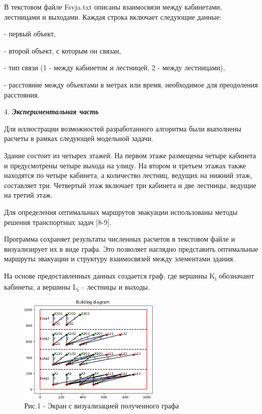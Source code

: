 \begin{multicols}{2}
В текстовом файле Fsvja.txt описаны взаимосвязи между кабинетами,
лестницами и выходами. Каждая строка включает следующие данные:

- первый объект,

- второй объект, с которым он связан,

- тип связи (1 - между кабинетом и лестницей, 2 - между лестницами),

- расстояние между объектами в метрах или время, необходимое для
преодоления расстояния.

4. \emph{{\bfseries Экспериментальная часть}}

Для иллюстрации возможностей разработанного алгоритма были выполнены
расчеты в рамках следующей модельной задачи.

Здание состоит из четырех этажей. На первом этаже размещены четыре
кабинета и предусмотрены четыре выхода на улицу. На втором и третьем
этажах также находятся по четыре кабинета, а количество лестниц, ведущих
на нижний этаж, составляет три. Четвертый этаж включает три кабинета и
две лестницы, ведущие на третий этаж.

Для определения оптимальных маршрутов эвакуации использованы методы
решения транспортных задач {[}8-9{]}.

Программа сохраняет результаты численных расчетов в текстовом файле и
визуализирует их в виде графа. Это позволяет наглядно представить
оптимальные маршруты эвакуации и структуру взаимосвязей между элементами
здания.

На основе предоставленных данных создается граф, где вершины
K\textsubscript{i} обозначают кабинеты, а вершины L\textsubscript{i} --
лестницы и выходы.
\end{multicols}

\begin{figure}[H]
	\centering
	\includegraphics[width=0.6\textwidth]{media/ict2/image7}
	\caption*{Рис.1 - Экран с визуализацией полученного графа}
\end{figure}

